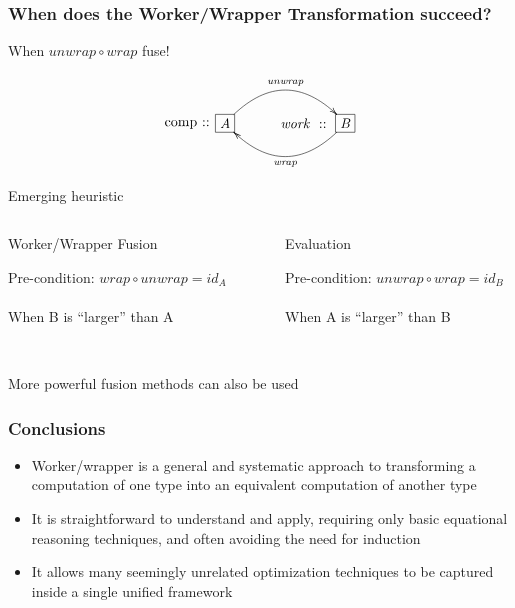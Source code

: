 \documentclass[smaller]{beamer}
\makeatletter
\newcommand{\Conid}[1]{\mathit{#1}}
\newcommand{\Varid}[1]{\mathit{#1}}
\newcommand{\wrapunwrap}[3]
{$$\xymatrix@C=18pt@R=0pt{
        *[r]{\raisebox{-6pt}{#1\ ::\hspace*{-3pt}}}
      & *+[F-:]{#2} 
                \ar@/^2pc/[rr]^-{\ensuremath{\Varid{unwrap}}}
      & *[r]{\ensuremath{\Varid{work}}\ ::\ }
      & *+[F-:]{#3}="work"
                \ar@/^2pc/[ll]^-{\ensuremath{\Varid{wrap}}} 
}$$}
\makeatother
\begin{document}
\begin{frame}[fragile] 
\frametitle{When does the Worker/Wrapper Transformation succeed?}

When \ensuremath{\Varid{unwrap}\mathbin{\circ}\Varid{wrap}} fuse! 

\wrapunwrap{comp}{\ensuremath{\Conid{A}}}{\ensuremath{\Conid{B}}}

Emerging heuristic

\begin{columns}[t] 
\begin{column}{0.42\textwidth}
\begin{block}{Worker/Wrapper Fusion}
\begin{center}
Pre-condition: \ensuremath{\Varid{wrap}\mathbin{\circ}\Varid{unwrap}\mathrel{=}\Varid{id}}$_{\ensuremath{\Conid{A}}}$\\
~\\[5pt]
When B is ``larger'' than A
\end{center}
\end{block}
\end{column}

\begin{column}{0.04\textwidth}
\end{column}

\begin{column}{0.42\textwidth}
\begin{block}{Evaluation}
\begin{center}
Pre-condition: \ensuremath{\Varid{unwrap}\mathbin{\circ}\Varid{wrap}\mathrel{=}\Varid{id}}$_{\ensuremath{\Conid{B}}}$\\
~\\[5pt]
When A is ``larger'' than B
\end{center}
\end{block}
\end{column}
\end{columns}

{~}\\[5pt]
More powerful fusion methods can also be used

\end{frame}


\begin{frame}
\frametitle{Conclusions}

\begin{itemize}
\item Worker/wrapper is a general and systematic approach to transforming
a computation of one type into an equivalent computation of another type

\item It is straightforward to understand and apply, requiring
only basic equational reasoning techniques, and often avoiding
the need for induction

\item It allows many seemingly unrelated optimization
techniques to be captured inside a single unified framework
\end{itemize}

\end{frame}
\end{document}
